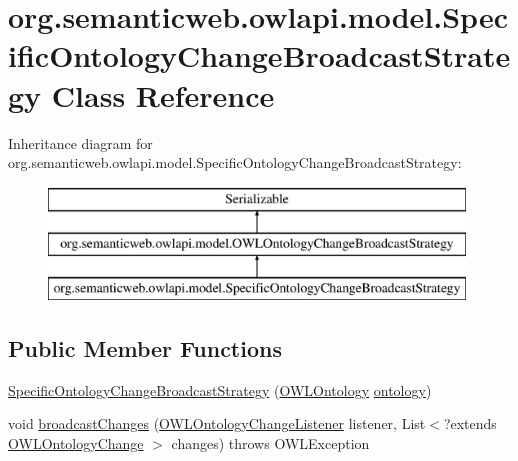 \hypertarget{classorg_1_1semanticweb_1_1owlapi_1_1model_1_1_specific_ontology_change_broadcast_strategy}{\section{org.\-semanticweb.\-owlapi.\-model.\-Specific\-Ontology\-Change\-Broadcast\-Strategy Class Reference}
\label{classorg_1_1semanticweb_1_1owlapi_1_1model_1_1_specific_ontology_change_broadcast_strategy}
}
Inheritance diagram for org.\-semanticweb.\-owlapi.\-model.\-Specific\-Ontology\-Change\-Broadcast\-Strategy\-:\begin{figure}[H]
\begin{center}
\leavevmode
\includegraphics[height=3.000000cm]{classorg_1_1semanticweb_1_1owlapi_1_1model_1_1_specific_ontology_change_broadcast_strategy}
\end{center}
\end{figure}
\subsection*{Public Member Functions}
\begin{DoxyCompactItemize}
\item 
\hyperlink{classorg_1_1semanticweb_1_1owlapi_1_1model_1_1_specific_ontology_change_broadcast_strategy_a4a13c64d40de03b10c4407e9f5f889e3}{Specific\-Ontology\-Change\-Broadcast\-Strategy} (\hyperlink{interfaceorg_1_1semanticweb_1_1owlapi_1_1model_1_1_o_w_l_ontology}{O\-W\-L\-Ontology} \hyperlink{classorg_1_1semanticweb_1_1owlapi_1_1model_1_1_specific_ontology_change_broadcast_strategy_af4b0b8748c0a20d8b82094032336d6d4}{ontology})
\item 
void \hyperlink{classorg_1_1semanticweb_1_1owlapi_1_1model_1_1_specific_ontology_change_broadcast_strategy_a9fafb4d373dd2ad0ec4569fd8758446d}{broadcast\-Changes} (\hyperlink{interfaceorg_1_1semanticweb_1_1owlapi_1_1model_1_1_o_w_l_ontology_change_listener}{O\-W\-L\-Ontology\-Change\-Listener} listener, List$<$?extends \hyperlink{classorg_1_1semanticweb_1_1owlapi_1_1model_1_1_o_w_l_ontology_change}{O\-W\-L\-Ontology\-Change} $>$ changes)  throws O\-W\-L\-Exception 
\end{DoxyCompactItemize}
